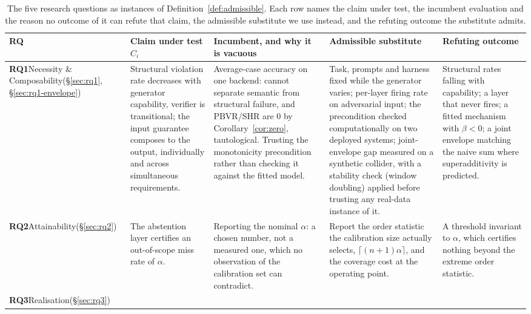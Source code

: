 \documentclass[journal, 10pt]{IEEEtran}
\begin{document}
\begin{table}[!t]
\centering
\caption{The five research questions as instances of Definition~\ref{def:admissible}. Each row names the claim under test, the incumbent evaluation and the reason no outcome of it can refute that claim, the admissible substitute we use instead, and the refuting outcome the substitute admits.}
\label{tab:rq-spine}
\footnotesize
\setlength{\tabcolsep}{4pt}
\begin{tabular}{p{1.5cm}p{3.2cm}p{4.2cm}p{3.9cm}p{3.5cm}}
\toprule
\textbf{RQ} & \textbf{Claim under test $C_i$} & \textbf{Incumbent, and why it is vacuous} & \textbf{Admissible substitute} & \textbf{Refuting outcome} \\
\midrule
\textbf{RQ1}\newline Necessity \& Composability\newline (\S\ref{sec:rq1}, \S\ref{sec:rq1-envelope})
& Structural violation rate decreases with generator capability, verifier is transitional; the input guarantee composes to the output, individually and across simultaneous requirements.
& Average-case accuracy on one backend: cannot separate semantic from structural failure, and PBVR/SHR are $0$ by Corollary~\ref{cor:zero}, tautological. Trusting the monotonicity precondition rather than checking it against the fitted model.
& Task, prompts and harness fixed while the generator varies; per-layer firing rate on adversarial input; the precondition checked computationally on two deployed systems; joint-envelope gap measured on a synthetic collider, with a stability check (window doubling) applied before trusting any real-data instance of it.
& Structural rates falling with capability; a layer that never fires; a fitted mechanism with $\beta{<}0$; a joint envelope matching the naive sum where superadditivity is predicted. \\
\addlinespace
\textbf{RQ2}\newline Attainability\newline (\S\ref{sec:rq2})
& The abstention layer certifies an out-of-scope miss rate of $\alpha$.
& Reporting the nominal $\alpha$: a chosen number, not a measured one, which no observation of the calibration set can contradict.
& Report the order statistic the calibration size actually selects, $\lceil (n{+}1)\alpha\rceil$, and the coverage cost at the operating point.
& A threshold invariant to $\alpha$, which certifies nothing beyond the extreme order statistic. \\
\addlinespace
\textbf{RQ3}\newline Realisation\newline (\S\ref{sec:rq3})

\end{tabular}
\end{table}
\end{document}
